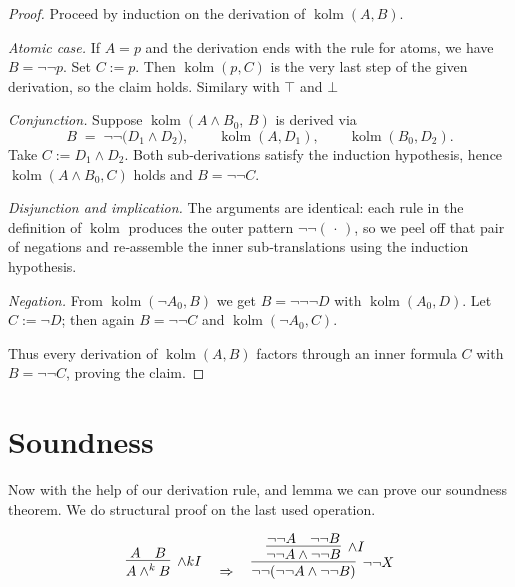 \documentclass{article}
\begin{document}
    \begin{proof}
    Proceed by induction on the derivation of \(\operatorname{kolm}(A,B)\).
    
    \smallskip
    \emph{Atomic case.}  
    If \(A=p\) and the derivation ends with the rule for atoms, we have
    \(B=\neg\neg p\).  
    Set \(C:=p\).  
    Then \(\operatorname{kolm}(p,C)\) is the very last step of the given
    derivation, so the claim holds. Similary with $\top$ and $\bot$
    
    \smallskip
    \emph{Conjunction.}  
    Suppose \(\operatorname{kolm}(A\land B_0,\,B)\) is derived via
    \[
       B \;=\; \neg\neg\bigl(D_1\land D_2\bigr),
       \qquad
       \operatorname{kolm}(A,D_1),
       \qquad
       \operatorname{kolm}(B_0,D_2).
    \]
    Take \(C := D_1\land D_2\).
    Both sub‑derivations satisfy the induction hypothesis, hence
    \(\operatorname{kolm}(A\land B_0,C)\) holds and
    \(B=\neg\neg C\).
    
    \smallskip
    \emph{Disjunction and implication.}  
    The arguments are identical: each rule in the definition of
    \(\operatorname{kolm}\) produces the outer pattern
    \(\neg\neg(\,\cdot\,)\), so we peel off that pair of negations and
    re‑assemble the inner sub‑translations using the induction hypothesis.
    
    \smallskip
    \emph{Negation.}  
    From \(\operatorname{kolm}(\neg A_0,B)\) we get
    \(B=\neg\neg\neg D\) with \(\operatorname{kolm}(A_0,D)\).
    Let \(C := \neg D\); then again \(B=\neg\neg C\) and
    \(\operatorname{kolm}(\neg A_0,C)\).
    
    \smallskip
    Thus every derivation of \(\operatorname{kolm}(A,B)\) factors through
    an inner formula \(C\) with \(B=\neg\neg C\), proving the claim.
    \end{proof}
    



\section{Soundness}

Now with the help of our derivation rule, and lemma we can prove our soundness theorem. We do structural proof on the last used operation.

\vspace{3em}
\[
\infer[\land kI]{A \land^k B}{A & B}
\quad \Rightarrow \quad
\infer[\neg\neg X]{\neg\neg(\neg\neg A \land \neg\neg B)}{
    \infer[\land I]{\neg\neg A \land \neg\neg B}{
      \neg\neg A & \neg\neg B
    }
}
\]
\end{document}
